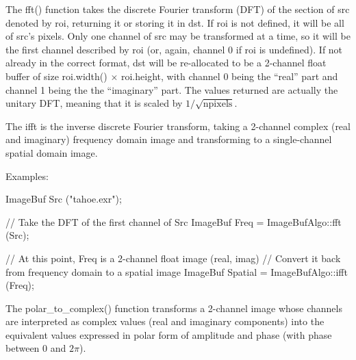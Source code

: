 The {\cf fft()} function takes the discrete Fourier transform (DFT) of
the section of {\cf src} denoted by {\cf roi}, returning it or storing it in {\cf dst}.
If {\cf roi} is not defined, it will be all of {\cf src}'s pixels.  Only
one channel of {\cf src} may be transformed at a time, so it will be the
first channel described by {\cf roi} (or, again, channel 0 if {\cf roi}
is undefined).  If not already in the correct format, {\cf dst} will be
re-allocated to be a 2-channel {\cf float} buffer of size
{\cf roi.width()} $\times$ {\cf roi.height}, with channel 0 being the
``real'' part and channel 1 being the the ``imaginary'' part.  The
values returned are actually the unitary DFT, meaning that it is scaled
by $1/\sqrt{\mathrm{npixels}}$.

The {\cf ifft} is the inverse discrete Fourier transform, taking a 2-channel
complex (real and imaginary) frequency domain image and transforming to a
single-channel spatial domain image.

\smallskip
\noindent Examples:
\begin{code}
    ImageBuf Src ("tahoe.exr");

    // Take the DFT of the first channel of Src
    ImageBuf Freq = ImageBufAlgo::fft (Src);

    // At this point, Freq is a 2-channel float image (real, imag)
    // Convert it back from frequency domain to a spatial image
    ImageBuf Spatial = ImageBufAlgo::ifft (Freq);
\end{code}
\apiend

 
 

The {\cf polar_to_complex()} function transforms a 2-channel image whose
channels are interpreted as complex values (real and imaginary components)
into the equivalent values expressed in polar form of amplitude and phase
(with phase between $0$ and $2\pi$).

